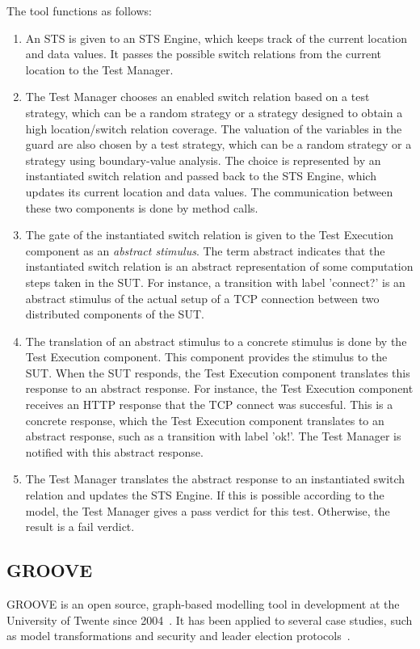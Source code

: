 The tool functions as follows: 
\begin{enumerate}
  \item An STS is given to an STS Engine, which keeps track of the current location and data values. It passes the possible switch relations from the current location to the Test Manager.
  \item The Test Manager chooses an enabled switch relation based on a test strategy, which can be a random strategy or a strategy designed to obtain a high location/switch relation coverage. The valuation of the variables in the guard are also chosen by a test strategy, which can be a random strategy or a strategy using boundary-value analysis. The choice is represented by an instantiated switch relation and passed back to the STS Engine, which updates its current location and data values. The communication between these two components is done by method calls.
  \item The gate of the instantiated switch relation is given to the Test Execution component as an \textit{abstract stimulus}. The term abstract indicates that the instantiated switch relation is an abstract representation of some computation steps taken in the SUT. For instance, a transition with label 'connect?' is an abstract stimulus of the actual setup of a TCP connection between two distributed components of the SUT. 
  \item The translation of an abstract stimulus to a concrete stimulus is done by the Test Execution component. This component provides the stimulus to the SUT. When the SUT responds, the Test Execution component translates this response to an abstract response. For instance, the Test Execution component receives an HTTP response that the TCP connect was succesful. This is a concrete response, which the Test Execution component translates to an abstract response, such as a transition with label 'ok!'. The Test Manager is notified with this abstract response.
  \item The Test Manager translates the abstract response to an instantiated switch relation and updates the STS Engine. If this is possible according to the model, the Test Manager gives a pass verdict for this test. Otherwise, the result is a fail verdict.
\end{enumerate}

\subsection{GROOVE}\label{sec:descriptiongroove}
GROOVE is an open source, graph-based modelling tool in development at the University of Twente since 2004~\cite{Rensink:GROOVE}. It has been applied to several case studies, such as model transformations and security and leader election protocols~\cite{Ghamarian:GROOVE}.

